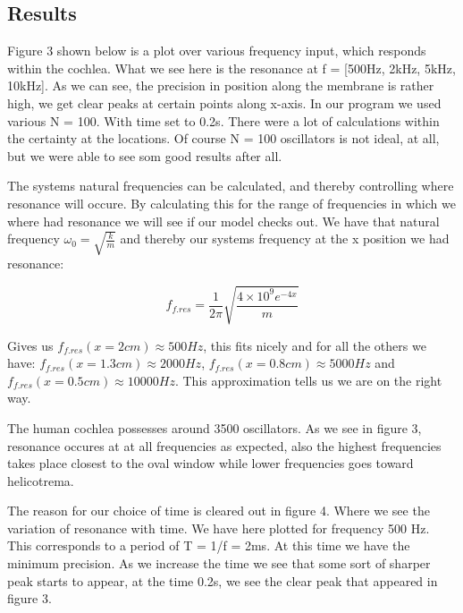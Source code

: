 \documentclass[twoside,twocolumn]{article}
\begin{document}
\subsection{Results}


Figure 3 shown below is a plot over various frequency input, which responds within the cochlea. What we see here is the resonance at f = [500Hz, 2kHz, 5kHz, 10kHz]. 
As we can see, the precision in position along the membrane is rather high, we get clear peaks at certain points along x-axis. In our program we used various N = 100. With time set to 0.2s.  There were a lot of calculations within the certainty at the locations. Of course N = 100 oscillators is not ideal, at all, but we were able to see som good results after all.

\bigskip
The systems natural frequencies can be calculated, and thereby controlling where resonance will occure. By calculating this for the range of frequencies in which we where had resonance we will see if our model checks out. We have that natural frequency $\omega_0 = \sqrt{\frac{k}{m}}$ and thereby our systems frequency at the x position we had resonance: 

\begin{equation} 
f_{f.res} = \frac{1}{2\pi}\sqrt{\frac{4 \times 10^9 e^{-4x}}{m}}
\end{equation}

Gives us $ f_{f.res}(x = 2cm) \approx 500Hz$, this fits nicely and for all the others we have:  $ f_{f.res}(x = 1.3cm) \approx 2000Hz $,  $ f_{f.res}(x = 0.8cm)\approx5000Hz $ and  $ f_{f.res}(x = 0.5cm) \approx 10000Hz $. This approximation tells us we are on the right way. 

\bigskip

The human cochlea possesses around 3500 oscillators. As we see in figure 3, resonance occures at at all frequencies as expected, also the highest frequencies takes place closest to the oval window while lower frequencies goes toward helicotrema. 

\bigskip

The reason for our choice of time is cleared out in figure 4. Where we see the variation of resonance with time. We have here plotted for frequency 500 Hz. This corresponds to a period of T = 1/f = 2ms. At this time we have the minimum precision. As we increase the time we see that some sort of sharper peak starts to appear, at the time 0.2s, we see the clear peak that appeared in figure 3.  
\end{document}

